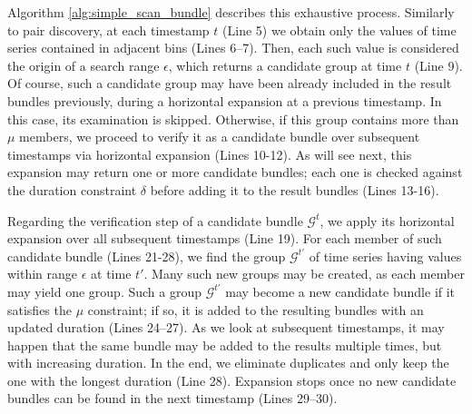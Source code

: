 
Algorithm \ref{alg:simple_scan_bundle} describes this exhaustive process. Similarly to pair discovery, at each timestamp $t$ (Line 5) we obtain only the values of time series contained in adjacent bins (Lines 6--7). Then, each such value is considered the origin of a search range $\epsilon$, which returns a candidate group at time $t$ (Line 9). Of course, such a candidate group may have been already included in the result bundles previously, during a horizontal expansion at a previous timestamp. In this case, its examination is skipped. Otherwise, if this group contains more than $\mu$ members, we proceed to verify it as a candidate bundle over subsequent timestamps via horizontal expansion (Lines 10-12). As will see next, this expansion may return one or more candidate bundles; each one is checked against the duration constraint $\delta$ before adding it to the result bundles (Lines 13-16).

Regarding the verification step of a candidate bundle $\mathcal{G}^t$, we apply its horizontal expansion over all subsequent timestamps (Line 19). For each member of such candidate bundle (Lines 21-28), we find the group $\mathcal{G}^{t'}$ of time series having values within range $\epsilon$ at time $t'$. Many such new groups may be created, as each member may yield one group. Such a group $\mathcal{G}^{t'}$ may become a new candidate bundle if it satisfies the $\mu$ constraint; if so, it is added to the resulting bundles with an updated duration (Lines 24--27). As we look at subsequent timestamps, it may happen that the same bundle may be added to the results multiple times, but with increasing duration. In the end, we eliminate duplicates and only keep the one with the longest duration (Line 28). Expansion stops once no new candidate bundles can be found in the next timestamp (Lines 29--30).




